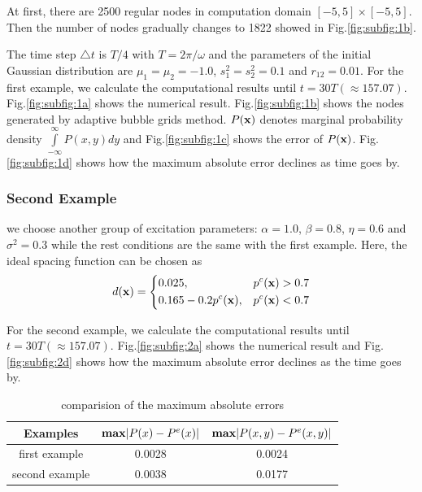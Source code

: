 \documentclass[a4paper, 11pt, final]{article}
\begin{document}
At first, there are 2500 regular nodes in computation domain $[-5,5] \times [-5,5]$.
Then the number of nodes gradually changes to 1822 showed in Fig.\;\ref{fig:subfig:1b}.

The time step $\triangle t$ is $T/4$
with $T=2\pi/\omega$ and the parameters of the initial Gaussian
distribution are $\mu_1=\mu_2=-1.0$, $s_1^2=s_2^2=0.1$ and
$r_{12}=0.01$. For the first example,
we calculate the computational results until $t=30T(\approx 157.07)$.
Fig.\;\ref{fig:subfig:1a} shows the numerical result.
Fig.\;\ref{fig:subfig:1b} shows the nodes generated by adaptive bubble grids method.
$P(\bf x)$ denotes marginal probability density
$\int\limits_{ - \infty }^\infty {P(x,y)dy}$ and Fig.\;\ref{fig:subfig:1c}
shows the error of $P(\bf x)$.
Fig.\;\ref{fig:subfig:1d} shows how the maximum 
absolute error declines as time goes by.


\subsubsection{Second Example}
we choose another group of excitation parameters:
$\alpha=1.0$, $\beta=0.8$, $\eta=0.6$ and $\sigma^2=0.3$
while the rest conditions are the same with the first example. Here, the ideal
spacing function can be chosen as
\[d({\bf x}) = \left\{ \begin{aligned}
    &0.025,                     & p^c({\bf x}) > 0.7 \\
    &0.165 - 0.2p^c({\bf x}),   & p^c({\bf x}) < 0.7 \\
\end{aligned} \right.\]

For the second example,
we calculate the computational results until $t=30T(\approx 157.07)$.
Fig.\;\ref{fig:subfig:2a} shows the numerical result and Fig.\;\ref{fig:subfig:2d} shows how the maximum
absolute error declines as the time goes by.


\begin{table}[htbp]
    \centering
    \caption{comparision of the maximum absolute errors}
    \begin{tabular}[c]{ccc}
        \toprule
        Examples         & ${\bf max}|P(x)-P^e(x)|$      & ${\bf max}|P(x,y)-P^e(x,y)|$ \\
        \midrule
        first example    & 0.0028      & 0.0024 \\
        second example   & 0.0038      & 0.0177 \\
        \bottomrule
    \end{tabular}
\end{table}
\end{document}
